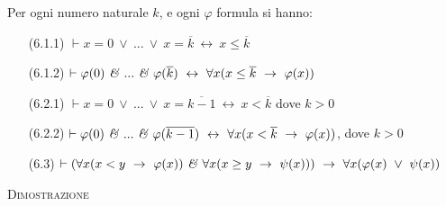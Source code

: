 \vspace{.5cm}
\newpage
\begin{prop}
Per ogni numero naturale $k$, e ogni $\varphi$ formula si hanno:
\vspace{.2cm}
\begin{enumerate}
	\item[(6.1.1)] $\vdash x=0\ \vee\ ...\ \vee\ x=\overline{k}\ \leftrightarrow\ x\leq \overline{k}$
	\vspace{.2cm}
	\item[(6.1.2)] $\vdash \varphi(0)\ \mbox{\emph{\&}}\ ...\ \mbox{\emph{\&}}\ \varphi(\overline{k})\ \leftrightarrow\ \forall x (x\leq \overline{k}\ \to\ \varphi(x))$
	\vspace{.2cm}
	\item[(6.2.1)] $\vdash x=0\ \vee\ ...\ \vee\ x=\overline{k-1}\ \leftrightarrow\ x<\overline{k}$ dove $k>0$
	\vspace{.2cm}
	\item[(6.2.2)] $\vdash \varphi(0)\ \mbox{\emph{\&}}\ ...\ \mbox{\emph{\&}}\ \varphi(\overline{k-1})\ \leftrightarrow\ \forall x (x<\overline{k}\ \to\ \varphi(x))$, dove $k>0$
	\vspace{.2cm}
	\item[(6.3)] $\vdash (\forall x (x<y\ \to\ \varphi(x))\ \mbox{\emph{\&}}\ \forall x (x\geq y\ \to\ \psi(x)))\ \to\ \forall x (\varphi(x)\ \vee\ \psi(x))$
\end{enumerate}
\end{prop}
\vspace{.6cm}
\textsc{Dimostrazione}
\vspace{.2cm}
